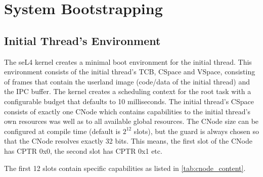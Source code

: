 %
%
%
%

\chapter{\label{ch:bootup}System Bootstrapping}

\section{Initial Thread's Environment}

The seL4 kernel creates a minimal boot environment for the initial thread.
This environment consists of the initial thread's TCB, CSpace and VSpace,
consisting of frames that contain the userland image (code/data of the initial
thread) and the IPC buffer.
The kernel creates a scheduling context for the root task with a configurable budget that defaults to 10 milliseconds.
The initial thread's CSpace consists of exactly one CNode
which contains capabilities to the initial
thread's own resources was well as to all available global resources.
The CNode size can be configured at compile time (default is $2^{12}$
slots), but the guard is always chosen so that the CNode resolves exactly
32 bits. This means, the first slot of the CNode has CPTR 0x0, the
second slot has CPTR 0x1 etc.

The first 12 slots contain specific capabilities as listed in
\autoref{tab:cnode_content}.

